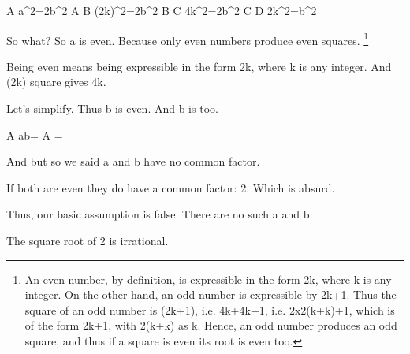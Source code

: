 \endslide




\Mathstep A {a^2=2b^2}
\mathstep A B {(2k)^2=2b^2}
\mathstep B C {4k^2=2b^2}
\mathstep C D {2k^2=b^2}

\step[visible=true] So what?
\step So a is even. Because only even numbers produce even squares.%
\footnote{%
  An even number, by definition, is expressible
  in the form 2k, where k is any integer.
  On the other hand, an odd number is expressible
  by 2k+1. Thus the square of an odd number is
  (2k+1), i.e. 4k+4k+1, i.e.
  2x2(k+k)+1, which is of the form 2k+1,
  with 2(k+k) as k.
  Hence, an odd number produces an odd square,
  and thus if a square is even its root is even too.}

\step[A] Being even means being expressible in the form 2k, where k is
any integer.
\step[B] And (2k) square gives 4k.

\step[C] Let's simplify.
\step Thus b is even.
\step And b is too.

\endslide




\Mathstep A {{a\over b}=}
\mathstep A {} {\rlap{}=}

\step[visible=true] And but so we said a and b have no common factor.

\step If both are even they do have a common factor: 2.
\step Which is absurd.

\step Thus, our basic assumption is false.
\step[A] There are no such a and b.

\step The square root of 2 is irrational.

\endslide

\bye